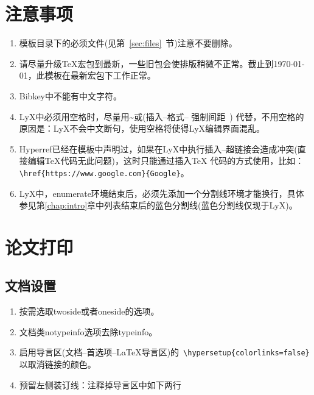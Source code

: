 \documentclass[twoside,longtitle]{LZUthesis}
\begin{document}
\section{注意事项}
\begin{enumerate}
\item 模板目录下的必须文件(见第~\ref{sec:files}~节)注意不要删除。
\item 请尽量升级\TeX{}宏包到最新，一些旧包会使排版稍微不正常。截止到\today ，此模板在最新宏包下工作正常。
\item Bibkey中不能有中文字符。
\item LyX中必须用空格时，尽量用\textasciitilde{}或(插入--格式-- 强制间距~) 代替，不用空格的原因是：LyX不会中文断句，使用空格将使得LyX编辑界面混乱。
\item Hyperref已经在模板中声明过，如果在LyX中执行插入--超链接会造成冲突(直接编辑\TeX{}代码无此问题)，这时只能通过插入\TeX{} 代码的方式使用，比如：\lstinline!\href{https://www.google.com}{Google}!。
\item LyX中，enumerate环境结束后，必须先添加一个分割线环境才能换行，具体参见第\ref{chap:intro}章中列表结束后的蓝色分割线(蓝色分割线仅现于LyX)。
\end{enumerate}

\section{论文打印}


\subsection{文档设置}
\begin{enumerate}
\item 按需选取twoside或者oneside的选项。
\item 文档类notypeinfo选项去除typeinfo。
\item 启用导言区(文档--首选项--\LaTeX{}导言区)的~\lstinline!\hypersetup{colorlinks=false}!以取消链接的颜色。
\item 预留左侧装订线：注释掉导言区中如下两行



\end{enumerate}
\end{document}
